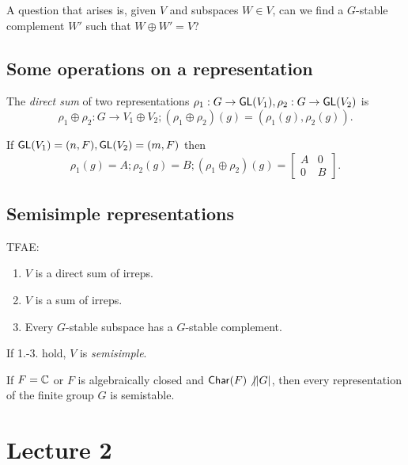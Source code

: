 A question that arises is, given $V$ and subspaces $W \in V$, can we find a $G$-stable complement $W'$ such that $W \oplus W'= V$? 

\subsection{Some operations on a representation}
\begin{definition}
The \emph{direct sum} of two representations $\rho_1: G \to \mathsf{GL}(V_1), \rho_2: G \to \mathsf{GL}(V_2)$ is 
\[
\rho_1 \oplus \rho_2: G \to V_1 \oplus V_2; (\rho_1 \oplus \rho_2)(g) = (\rho_1(g), \rho_2(g)).
\]
\end{definition}
\begin{remark}
If $\mathsf{GL}(V_1) = (n, F), \mathsf{GL}(V_2) = (m, F)$ then 
\[
\rho_1(g) = A; \rho_2(g) = B; (\rho_1 \oplus \rho_2)(g) = 
\begin{bmatrix}
A & 0 \\
0 & B
\end{bmatrix}
.
\]
\end{remark}
\subsection{Semisimple representations}
\begin{theorem}
TFAE:
\begin{enumerate}
    \item $V$ is a direct sum of irreps.
    \item $V$ is a sum of irreps.
    \item Every $G$-stable subspace has a $G$-stable complement.
\end{enumerate}
\end{theorem}
\begin{definition}
If 1.-3. hold, $V$ is \emph{semisimple}. 
\end{definition}
\begin{theorem}[Maschke]
If $F = \mathbb{C}$ or $F$ is algebraically closed and $\mathsf{Char}(F) \not | \lvert G \rvert$, then every representation of the finite group $G$ is semistable.
\end{theorem}







\section{Lecture 2}
